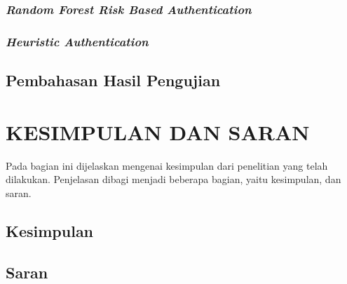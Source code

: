 \documentclass[ugmtesis]{ugmtesis}
\begin{document}
		\subsection{\textit{Random Forest Risk Based Authentication}}
		\label{Random Forest Risk Based Authentication}
		

		\subsection{\textit{Heuristic Authentication}}
		\label{Heuristic Authentication}
		


	\section{Pembahasan Hasil Pengujian}
	\label{pembahasan hasil pengujian}
	




\chapter{KESIMPULAN DAN SARAN}
\label{kesimpulan dan saran}
Pada bagian ini dijelaskan mengenai kesimpulan dari penelitian yang telah dilakukan. Penjelasan dibagi menjadi beberapa bagian, yaitu kesimpulan, dan saran.

	\section{Kesimpulan}
	\label{penutup kesimpulan}
	

	\section{Saran}
	\label{penutup saran}
	



\end{document}
